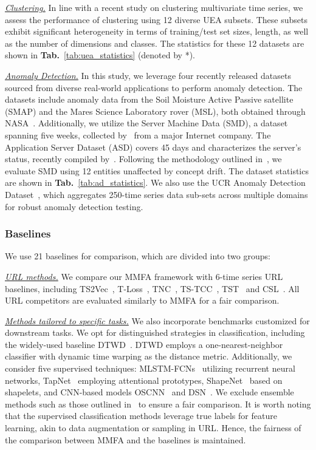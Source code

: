 \textit{\underline{Clustering.}} In line with a recent study on clustering multivariate time series, we assess the performance of clustering using 12 diverse UEA subsets. These subsets exhibit significant heterogeneity in terms of training/test set sizes, length, as well as the number of dimensions and classes. The statistics for these 12 datasets are shown in \textbf{Tab.}~\ref{tab:uea_statistics} (denoted by *).


\textit{\underline{Anomaly Detection.}} In this study, we leverage four recently released datasets sourced from diverse real-world applications to perform anomaly detection. The datasets include anomaly data from the Soil Moisture Active Passive satellite (SMAP) and the Mares Science Laboratory rover (MSL), both obtained through NASA~\cite{hundman2018detecting}. Additionally, we utilize the Server Machine Data (SMD), a dataset spanning five weeks, collected by~\cite{su2019robust} from a major Internet company. The Application Server Dataset (ASD) covers 45 days and characterizes the server's status, recently compiled by~\cite{li2021multivariate}. Following the methodology outlined in~\cite{li2021multivariate}, we evaluate SMD using 12 entities unaffected by concept drift. The dataset statistics are shown in \textbf{Tab.}~\ref{tab:ad_statistics}. We also use the UCR Anomaly Detection Dataset~\cite{Wu2020CurrentTS}, which aggregates 250-time series data sub-sets across multiple domains for robust anomaly detection testing.

\subsubsection{Baselines} We use 21 baselines for comparison, which are divided into two groups:

\textit{\underline{URL methods.}} We compare our MMFA framework with 6-time series URL baselines, including TS2Vec~\cite{yue2022ts2vec}, T-Loss~\cite{franceschi2019unsupervised}, TNC~\cite{tonekaboni2021unsupervised}, TS-TCC~\cite{eldele2021time},  TST~\cite{zerveas2021transformer} and CSL~\cite{liang2023contrastive}. All URL competitors are evaluated similarly to MMFA for a fair comparison.

\textit{\underline{Methods tailored to specific tasks.}} We also incorporate benchmarks customized for downstream tasks. We opt for distinguished strategies in classification, including the widely-used baseline DTWD~\cite{bagnall2018uea}. DTWD employs a one-nearest-neighbor classifier with dynamic time warping as the distance metric. Additionally, we consider five supervised techniques: MLSTM-FCNs~\cite{karim2019multivariate} utilizing recurrent neural networks, TapNet~\cite{zhang2020tapnet} employing attentional prototypes, ShapeNet~\cite{li2021shapenet} based on shapelets, and CNN-based models OSCNN~\cite{tang2020omni} and DSN~\cite{xiao2022dynamic}. We exclude ensemble methods such as those outlined in~\cite{lines2018time} to ensure a fair comparison. It is worth noting that the supervised classification methods leverage true labels for feature learning, akin to data augmentation or sampling in URL. Hence, the fairness of the comparison between MMFA and the baselines is maintained.

